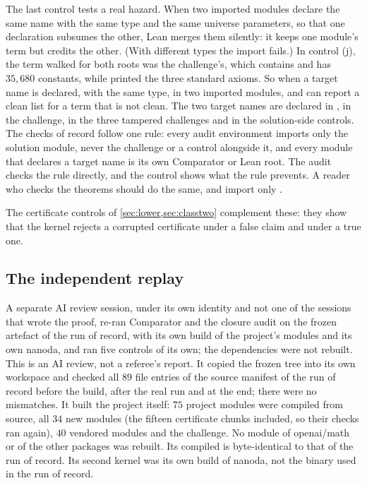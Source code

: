 \documentclass[11pt]{article}
\theoremstyle{definition}
\begin{document}
{The last control tests a real hazard. When two imported modules declare the same name with the same type and the same universe parameters, so that one declaration subsumes the other, Lean merges them silently: it keeps one module's term but credits the other. (With different types the import fails.) In control (j), the term walked for both roots was the challenge's, which contains  and has $35{,}680$ constants, while  printed the three standard axioms. So when a target name is declared, with the same type, in two imported modules,  and  can report a clean list for a term that is not clean. The two target names are declared in , in the challenge, in the three tampered challenges and in the solution-side controls. The checks of record follow one rule: every audit environment imports only the solution module, never the challenge or a control alongside it, and every module that declares a target name is its own Comparator or Lean root. The audit checks the rule directly, and the control shows what the rule prevents. A reader who checks the theorems should do the same, and import only .

The certificate controls of \cref{sec:lower,sec:classtwo} complement these: they show that the kernel rejects a corrupted certificate under a false claim and under a true one.

\subsection{The independent replay}\label{sec:replay}

A separate AI review session, under its own identity and not one of the sessions that wrote the proof, re-ran Comparator and the closure audit on the frozen artefact of the run of record, with its own build of the project's modules and its own nanoda, and ran five controls of its own; the dependencies were not rebuilt. This is an AI review, not a referee's report. It copied the frozen tree into its own workspace and checked all $89$ file entries of the source manifest of the run of record before the build, after the real run and at the end; there were no mismatches. It built the project itself: $75$ project modules were compiled from source, all $34$ new modules (the fifteen certificate chunks included, so their  checks ran again), $40$ vendored modules and the challenge. No module of openai/math or of the other packages was rebuilt. Its compiled  is byte-identical to that of the run of record. Its second kernel was its own build of nanoda, not the binary used in the run of record.

}
\end{document}
